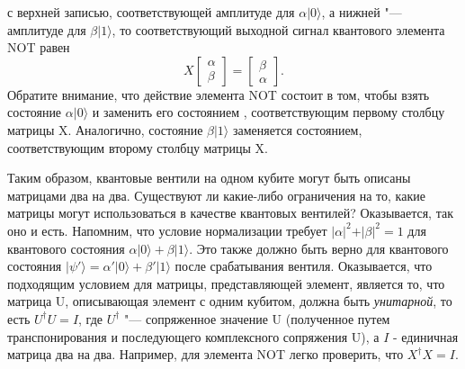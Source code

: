 \begin{multicols}{2}
{\begin{equation}
        \end{equation}
        с верхней записью, соответствующей амплитуде для $\alpha\vert0\rangle$, а нижней 
        "--- амплитуде для $\beta\vert1\rangle$, то соответствующий выходной сигнал квантового элемента NOT равен
        \begin{equation}
            X\begin{bmatrix}
                \alpha\\
                \beta
            \end{bmatrix}
            =\begin{bmatrix}
                \beta\\
                \alpha
            \end{bmatrix}.
        \end{equation}
        Обратите внимание, что действие элемента NOT состоит в том, чтобы взять состояние $\alpha\vert0\rangle$ и заменить его состоянием
        , соответствующим первому столбцу матрицы X. Аналогично, состояние $\beta\vert1\rangle$ заменяется
        состоянием, соответствующим второму столбцу матрицы X.

        Таким образом, квантовые вентили на одном кубите могут быть описаны матрицами два на два. Существуют ли
        какие-либо ограничения на то, какие матрицы могут использоваться в качестве квантовых вентилей? Оказывается,
        так оно и есть. Напомним, что условие нормализации требует $\vert\alpha\vert^2 + \vert\beta\vert^2=1$ для квантового состояния
        $\alpha\vert0\rangle + \beta\vert1\rangle$. Это также должно быть верно для квантового состояния 
        $\vert\psi'\rangle = \alpha'\vert0\rangle+\beta'\vert1\rangle$ после срабатывания вентиля. Оказывается, что подходящим условием для матрицы, представляющей
        элемент, является то, что матрица U, описывающая элемент с одним кубитом, должна быть \emph{унитарной}, то есть $U^{\dagger} U=I$, где $U^{\dagger}$ "---
        сопряженное значение U (полученное путем транспонирования и последующего комплексного сопряжения U), а $I$ - единичная матрица два на два. Например, для элемента NOT легко
        проверить, что $X^{\dagger} X = I$.

}
\end{multicols}
